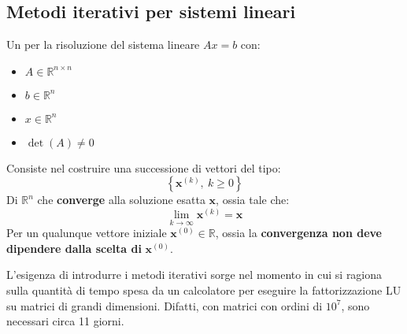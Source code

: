\subsection{Metodi iterativi per sistemi lineari}

Un  per la risoluzione del sistema lineare $Ax = b$ con:
\begin{itemize}
    \item $A \in \mathbb{R}^{n \times n}$
    \item $b \in \mathbb{R}^{n}$
    \item $x \in \mathbb{R}^{n}$
    \item $\det\left(A\right) \ne 0$
\end{itemize}
Consiste nel costruire una successione di vettori del tipo:
\begin{equation*}
    \left\{\mathbf{x}^{\left(k\right)}, \: k \ge 0\right\}
\end{equation*}
Di $\mathbb{R}^{n}$ che \textbf{converge} alla soluzione esatta $\mathbf{x}$, ossia tale che:
\begin{equation}
    \displaystyle\lim_{k \rightarrow \infty} \mathbf{x}^{\left(k\right)} = \mathbf{x}
\end{equation}
Per un qualunque vettore iniziale $\mathbf{x}^{\left(0\right)} \in \mathbb{R}$, ossia la \textbf{convergenza non deve dipendere dalla scelta di} $\mathbf{x}^{\left(0\right)}$.

\highspace
L'esigenza di introdurre i metodi iterativi sorge nel momento in cui si ragiona sulla quantità di tempo spesa da un calcolatore per eseguire la fattorizzazione LU su matrici di grandi dimensioni. Difatti, con matrici con ordini di $10^{7}$, sono necessari circa 11 giorni.